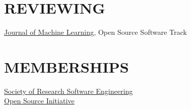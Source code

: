 \documentclass{cv}
\begin{document}

\section{REVIEWING}

\href{https://www.jmlr.org}{Journal of Machine Learning}, Open Source Software Track

\section{MEMBERSHIPS}

\href{https://society-rse.org/}{Society of Research Software Engineering} \\

\href{http://opensource.org}{Open Source Initiative}

\end{document}
